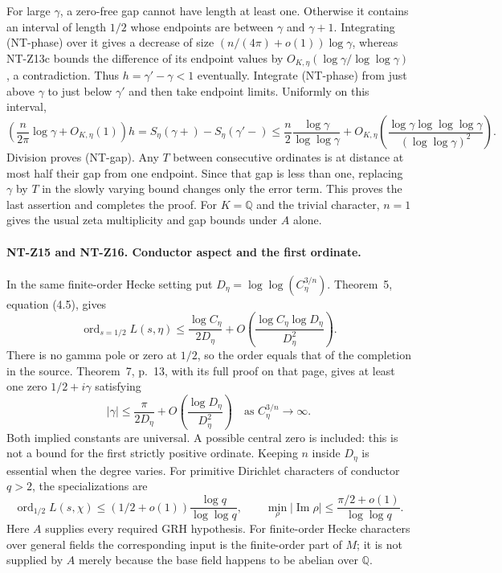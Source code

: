 \documentclass[11pt,a4paper]{article}
\begin{document}
For large $\gamma$, a zero-free gap cannot have length at least one.
Otherwise it contains an interval of length $1/2$ whose endpoints
are between $\gamma$ and $\gamma+1$.  Integrating (NT-phase) over it
gives a decrease of size $(n/(4\pi)+o(1))\log\gamma$, whereas
NT-Z13c bounds the difference of its endpoint values by
$O_{K,\eta}(\log\gamma/\log\log\gamma)$, a contradiction.
Thus $h=\gamma'-\gamma<1$ eventually.  Integrate (NT-phase) from
just above $\gamma$ to just below $\gamma'$ and then take endpoint
limits.  Uniformly on this interval,
\[
 \left(\frac n{2\pi}\log\gamma+O_{K,\eta}(1)\right)h
   =S_\eta(\gamma+)-S_\eta(\gamma'-)
   \le\frac n2\frac{\log\gamma}{\log\log\gamma}
      +O_{K,\eta}\left(
       \frac{\log\gamma\log\log\log\gamma}
            {(\log\log\gamma)^2}\right).
\]
Division proves (NT-gap).  Any $T$ between consecutive ordinates is
at distance at most half their gap from one endpoint.  Since that
gap is less than one, replacing $\gamma$ by $T$ in the slowly varying
bound changes only the error term.  This proves the last assertion
and completes the proof.  For $K=\mathbb Q$ and the trivial
character, $n=1$ gives the usual zeta multiplicity and gap bounds
under $A$ alone.

\paragraph{NT-Z15 and NT-Z16. Conductor aspect and the first ordinate.}
In the same finite-order Hecke setting put
$D_\eta=\log\log(C_\eta^{3/n})$.
Theorem~5, equation (4.5), gives
\[
 \operatorname{ord}_{s=1/2}L(s,\eta)
 \le\frac{\log C_\eta}{2D_\eta}
   +O\left(\frac{\log C_\eta\log D_\eta}{D_\eta^2}\right).
\tag{NT-Z15}
\]
There is no gamma pole or zero at $1/2$, so the order equals that
of the completion in the source.  Theorem~7, p.~13, with its full
proof on that page, gives at least one zero $1/2+i\gamma$ satisfying
\[
 |\gamma|\le\frac{\pi}{2D_\eta}
          +O\left(\frac{\log D_\eta}{D_\eta^2}\right)
 \quad\text{as } C_\eta^{3/n}\longrightarrow\infty.
\tag{NT-Z16}
\]
Both implied constants are universal.  A possible central zero is
included: this is not a bound for the first strictly positive
ordinate.  Keeping $n$ inside $D_\eta$ is essential when the degree
varies.  For primitive Dirichlet characters of conductor $q>2$, the
specializations are
\[
 \operatorname{ord}_{1/2}L(s,\chi)
       \le(1/2+o(1))\frac{\log q}{\log\log q},\qquad
 \min_\rho|\operatorname{Im}\rho|
       \le\frac{\pi/2+o(1)}{\log\log q}.
\]
Here $A$ supplies every required GRH hypothesis.  For finite-order
Hecke characters over general fields the corresponding input is
the finite-order part of $M$; it is not supplied by $A$ merely
because the base field happens to be abelian over $\mathbb Q$.
\end{document}
